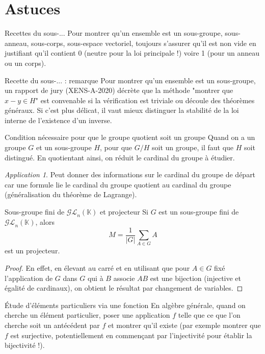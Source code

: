 \documentclass[french]{book}
\newcommand{\K}{\mathbb{K}}
\theoremstyle{plain}
\theoremstyle{definition}
\theoremstyle{remark}
\newtheorem*{app}{Application}
\begin{document}
\section{Astuces}
\begin{AS}{Recettes du sous-...} Pour montrer qu’un ensemble est un sous-groupe, sous-anneau, sous-corps, sous-espace vectoriel, toujours s’assurer qu’il est non vide en justifiant qu’il contient 0 (neutre pour la loi principale !) voire 1 (pour un anneau ou un corps).
\end{AS}
\begin{AS}{Recette du sous-... : remarque} Pour montrer qu’un ensemble est un sous-groupe, un rapport de jury (XENS-A-2020) décrète que la méthode "montrer que $x-y\in H$" est convenable si la vérification est triviale ou découle des théorèmes généraux. Si c’est plus délicat, il vaut mieux distinguer la stabilité de la loi interne de l’existence d’un inverse.
\end{AS}
\begin{AS}{Condition nécessaire pour que le groupe quotient soit un groupe} Quand on a un groupe $G$ et un sous-groupe $H$, pour que $G/H$ soit un groupe, il faut que $H$ soit distingué. En quotientant ainsi, on réduit le cardinal du groupe à étudier.
\end{AS}
\begin{app}
	Peut donner des informations sur le cardinal du groupe de départ car une formule lie le cardinal du groupe quotient au cardinal du groupe (généralisation du théorème de Lagrange).
\end{app}
\begin{AS}{Sous-groupe fini de $\mathcal{GL}_n(\K)$ et projecteur} Si $G$ est un sous-groupe fini de $\mathcal{GL}_n(\K)$, alors $$M=\frac{1}{|G|}\sum_{A\in G}A$$ est un projecteur.
\end{AS}
\begin{proof}
En effet, en élevant au carré et en utilisant que pour $A\in G$ fixé l'application de $G$ dans $G$ qui à $B$ associe $AB$ est une bijection (injective et égalité de cardinaux), on obtient le résultat par changement de variables.

\end{proof}
\begin{AS}{Étude d'éléments particuliers via une fonction} En algèbre générale, quand on cherche un élément particulier, poser une application $f$ telle que ce que l’on cherche soit un antécédent par $f$ et montrer qu’il existe (par exemple montrer que $f$ est surjective, potentiellement en commençant par l’injectivité pour établir la bijectivité !).
\end{AS}
\end{document}
